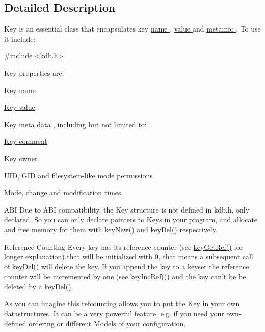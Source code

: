 \subsection{Detailed Description}
Key is an essential class that encapsulates key \hyperlink{group__keyname}{name }, \hyperlink{group__keyvalue}{value } and \hyperlink{group__keymeta}{metainfo }. To use it include\-: 
\begin{DoxyCode}
\textcolor{preprocessor}{#include <kdb.h>}
\end{DoxyCode}


Key properties are\-:
\begin{DoxyItemize}
\item \hyperlink{group__keyname}{Key name }
\item \hyperlink{group__keyvalue}{Key value }
\item \hyperlink{group__keymeta}{Key meta data }, including but not limited to\-:
\begin{DoxyItemize}
\item \hyperlink{group__meta_gafb89735689929ff717cc9f2d0d0b46a2}{Key comment }
\item \hyperlink{group__meta_ga35922a017bee8b4bcb493bbdfad9d6f5}{Key owner }
\item \hyperlink{group__keymeta}{U\-I\-D, G\-I\-D and filesystem-\/like mode permissions }
\item \hyperlink{group__keymeta}{Mode, change and modification times }
\end{DoxyItemize}
\end{DoxyItemize}

\begin{DoxyParagraph}{A\-B\-I}
Due to A\-B\-I compatibility, the {\ttfamily Key} structure is not defined in kdb.\-h, only declared. So you can only declare {\ttfamily pointers} to {\ttfamily Keys} in your program, and allocate and free memory for them with \hyperlink{group__key_gad23c65b44bf48d773759e1f9a4d43b89}{key\-New()} and \hyperlink{group__key_ga3df95bbc2494e3e6703ece5639be5bb1}{key\-Del()} respectively.
\end{DoxyParagraph}
\begin{DoxyParagraph}{Reference Counting}
Every key has its reference counter (see \hyperlink{group__key_ga4aabc4272506dd63161db2bbb42de8ae}{key\-Get\-Ref()} for longer explanation) that will be initialized with 0, that means a subsequent call of \hyperlink{group__key_ga3df95bbc2494e3e6703ece5639be5bb1}{key\-Del()} will delete the key. If you append the key to a keyset the reference counter will be incremented by one (see \hyperlink{group__key_ga6970a6f254d67af7e39f8e469bb162f1}{key\-Inc\-Ref()}) and the key can't be be deleted by a \hyperlink{group__key_ga3df95bbc2494e3e6703ece5639be5bb1}{key\-Del()}.
\end{DoxyParagraph}
\begin{DoxyParagraph}{}
As you can imagine this refcounting allows you to put the Key in your own datastructures. It can be a very powerful feature, e.\-g. if you need your own-\/defined ordering or different Models of your configuration. 
\end{DoxyParagraph}


